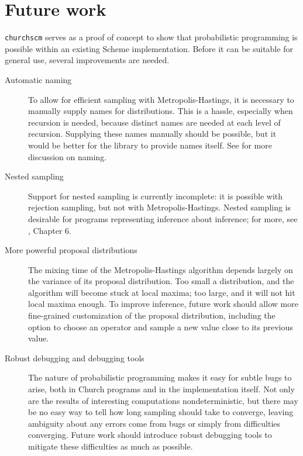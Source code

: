 \documentclass{article}
\begin{document}
\section{Future work}
\label{sec:futurework}

\texttt{churchscm} serves as a proof of concept to show that
probabilistic programming is possible within an existing Scheme
implementation. Before it can be suitable for general use, several
improvements are needed.

\begin{description}

\item[Automatic naming] To allow for efficient sampling with
  Metropolis-Hastings, it is necessary to manually supply names for
  distributions. This is a hassle, especially when recursion is
  needed, because distinct names are needed at each level of
  recursion. Supplying these names manually should be possible, but it
  would be better for the library to provide names itself. See
  \cite{wingate_lightweight_2011} for more discussion on naming.
    
\item[Nested sampling] Support for nested sampling is currently
  incomplete: it is possible with rejection sampling, but not with
  Metropolis-Hastings. Nested sampling is desirable for programs
  representing inference about inference; for more, see
  \cite{goodman_probabilistic_????}, Chapter 6.

\item[More powerful proposal distributions] The mixing time of the
  Metropolis-Hastings algorithm depends largely on the variance of its
  proposal distribution. Too small a distribution, and the algorithm
  will become stuck at local maxima; too large, and it will not hit
  local maxima enough. To improve inference, future work should allow
  more fine-grained customization of the proposal distribution,
  including the option to choose an operator and sample a new value
  close to its previous value.

\item[Robust debugging and debugging tools] The nature of
  probabilistic programming makes it easy for subtle bugs to arise,
  both in Church programs and in the implementation itself. Not only
  are the results of interesting computations nondeterministic, but
  there may be no easy way to tell how long sampling should take to
  converge, leaving ambiguity about any errors come from bugs or
  simply from difficulties converging. Future work should introduce
  robust debugging tools to mitigate these difficulties as much as
  possible.
  
\end{description}
\end{document}
